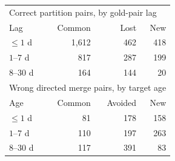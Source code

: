 \begin{tabular}{lrrr}
\toprule
\multicolumn{4}{l}{Correct partition pairs, by gold-pair lag} \\
Lag & Common & Lost & New \\
\midrule
$\leq1$ d & 1,612 & 462 & 418 \\
$1$--$7$ d & 817 & 287 & 199 \\
$8$--$30$ d & 164 & 144 & 20 \\
\midrule
\multicolumn{4}{l}{Wrong directed merge pairs, by target age} \\
Age & Common & Avoided & New \\
\midrule
$\leq1$ d & 81 & 178 & 158 \\
$1$--$7$ d & 110 & 197 & 263 \\
$8$--$30$ d & 117 & 391 & 83 \\
\bottomrule
\end{tabular}